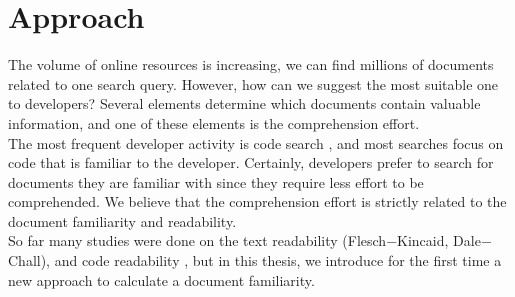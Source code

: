 \documentclass[12pt,mscthesis]{usiinfthesis}
\begin{document}
\chapter{Approach}
	The volume of online resources is increasing, we can find millions of documents related to one search query. However, how can we suggest the most suitable one to developers? Several elements determine which documents contain valuable information, and one of these elements is the comprehension effort.\\
 The most frequent developer activity is code search \cite{Singer-1997}, and most searches focus on code that is familiar to the developer\cite{Sadowski:2015}. Certainly, developers prefer to search for documents they are familiar with since they require less effort to be comprehended. We believe that the comprehension effort is strictly related to the document familiarity and readability.\\
 So far many studies were done on the text readability (Flesch$-$Kincaid, Dale$-$Chall), and code readability \cite{Buse:2010:LMC:1850489.1850615}, but in this thesis, we introduce for the first time a new approach to calculate a document familiarity.\\

	
	
\end{document}
